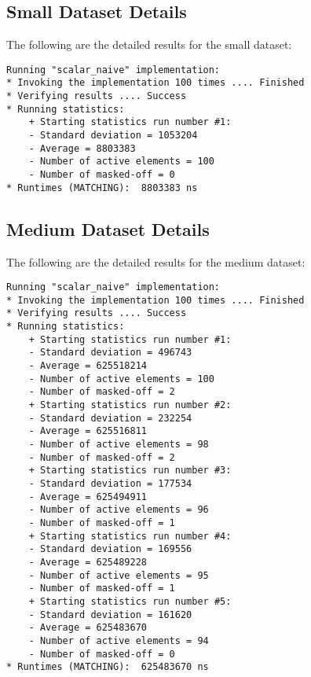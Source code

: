 \documentclass[12pt]{article}
\begin{document}
\subsection{Small Dataset Details}
The following are the detailed results for the small dataset:
\begin{lstlisting}[caption=Small Dataset Execution Details, style=customc]
Running "scalar_naive" implementation:
* Invoking the implementation 100 times .... Finished
* Verifying results .... Success
* Running statistics:
    + Starting statistics run number #1:
    - Standard deviation = 1053204
    - Average = 8803383
    - Number of active elements = 100
    - Number of masked-off = 0
* Runtimes (MATCHING):  8803383 ns
\end{lstlisting}


\subsection{Medium Dataset Details}
The following are the detailed results for the medium dataset:
\begin{lstlisting}[caption=Medium Dataset Execution Details, style=customc]
Running "scalar_naive" implementation:
* Invoking the implementation 100 times .... Finished
* Verifying results .... Success
* Running statistics:
    + Starting statistics run number #1:
    - Standard deviation = 496743
    - Average = 625518214
    - Number of active elements = 100
    - Number of masked-off = 2
    + Starting statistics run number #2:
    - Standard deviation = 232254
    - Average = 625516811
    - Number of active elements = 98
    - Number of masked-off = 2
    + Starting statistics run number #3:
    - Standard deviation = 177534
    - Average = 625494911
    - Number of active elements = 96
    - Number of masked-off = 1
    + Starting statistics run number #4:
    - Standard deviation = 169556
    - Average = 625489228
    - Number of active elements = 95
    - Number of masked-off = 1
    + Starting statistics run number #5:
    - Standard deviation = 161620
    - Average = 625483670
    - Number of active elements = 94
    - Number of masked-off = 0
* Runtimes (MATCHING):  625483670 ns
\end{lstlisting}
\newpage
\end{document}
